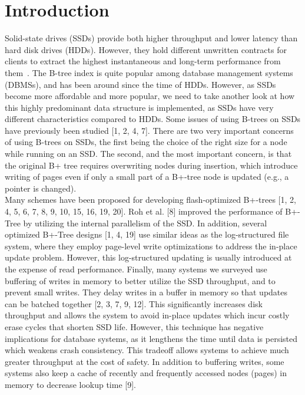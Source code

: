 \section{Introduction}

Solid-state drives (SSDs) provide both higher throughput and lower latency than hard disk drives (HDDs).
However, they hold different unwritten contracts for clients to extract the highest instantaneous and long-term performance from them~\cite{he2017unwritten}.
The B-tree index is quite popular among database management systems (DBMSs), and has been around since the time of HDDs.
However, as SSDs become more affordable and more popular, we need to take another look at how this highly predominant data structure is implemented, as SSDs have very different characteristics compared to HDDs.
Some issues of using B-trees on SSDs have previously been studied [1, 2, 4, 7].
There are two very important concerns of using B-trees on SSDs, the first being the choice of the right size for a node while running on an SSD.
The second, and the most important concern, is that the original B+ tree requires overwriting nodes during insertion, which introduce writing of pages even if only a small part of a B+-tree node is updated (e.g., a pointer is changed).\\

Many schemes have been proposed for developing flash-optimized B+-trees [1, 2, 4, 5, 6, 7, 8, 9, 10, 15, 16, 19, 20].
Roh et al. [8] improved the performance of B+-Tree by utilizing the internal parallelism of the SSD.
In addition, several optimized B+-Tree designs [1, 4, 19] use similar ideas as the log-structured file system, where they employ page-level write optimizations to address the in-place update problem.
However, this log-structured updating is usually introduced at the expense of read performance.
Finally, many systems we surveyed use buffering of writes in memory to better utilize the SSD throughput, and to prevent small writes.
They delay writes in a buffer in memory so that updates can be batched together [2, 3, 7, 9, 12].
This significantly increases disk throughput and allows the system to avoid in-place updates which incur costly erase cycles that shorten SSD life.
However, this technique has negative implications for database systems, as it lengthens the time until data is persisted which weakens crash consistency.
This tradeoff allows systems to achieve much greater throughput at the cost of safety.
In addition to buffering writes, some systems also keep a cache of recently and frequently accessed nodes (pages) in memory to decrease lookup time [9].\\

